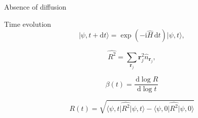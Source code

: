 \documentclass[1pt]{beamer}
\newcommand{\bra}[1]{\langle #1 \vert}
\newcommand{\ket}[1]{\vert#1\rangle}
\newcommand{\dd}{\,\mathrm{d}}
\begin{document}
\begin{frame}{Absence of diffusion}
\begin{alertblock}{Time evolution}
\begin{equation*}
\ket{\psi, t+\mathrm{d}t}=\exp\left(-\mathrm{i}\hat{H}\dd t\right)\ket{\psi, t},
\end{equation*}
\end{alertblock}{}\vspace{2mm}
\begin{minipage}{0.28\textwidth}
\begin{alertblock}{}
$$
\hat{R^2}=\sum\limits_{\mathbf{r}_j} \mathbf{r}_j^2 \hat{n}_{\mathbf{r}_j}, 
$$
\end{alertblock}{}
\begin{alertblock}{}
$$
\beta(t)=\frac{\dd \log R}{\dd \log t}
$$
\end{alertblock}{}
\end{minipage}\hfill
 \begin{minipage}{0.7\textwidth}
\begin{figure}
\end{figure}
\end{minipage}
\begin{alertblock}{}
$$
R(t)=\sqrt{\bra{\psi,t} \hat{R^2}\ket{\psi,t}-\bra{\psi,0} \hat{R^2}\ket{\psi,0}} 
$$
\end{alertblock}{}
\end{frame}
\end{document}
